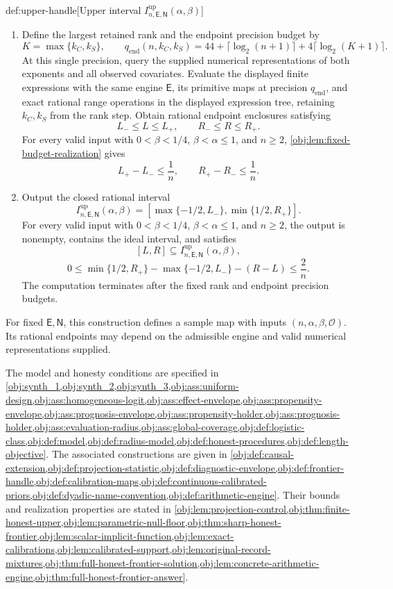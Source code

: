 \begin{algorithmv}{def:upper-handle}[Upper interval $I^{\mathrm{up}}_{n,\mathsf E,\mathsf N}(\alpha,\beta)$]
\begin{enumerate}
\item Define the largest retained rank and the endpoint precision budget by
\[
K=\max\{k_C,k_S\},
\qquad
q_{\mathrm{end}}(n,k_C,k_S)
=44+\lceil\log_2(n+1)\rceil
+4\lceil\log_2(K+1)\rceil.
\]
At this single precision, query the supplied numerical representations of both exponents and all observed covariates. Evaluate the displayed finite expressions with the same engine \(\mathsf E\), its primitive maps at precision \(q_{\mathrm{end}}\), and exact rational range operations in the displayed expression tree, retaining \(k_C,k_S\) from the rank step. Obtain rational endpoint enclosures satisfying
\[
L_-\le L\le L_+,
\qquad
R_-\le R\le R_+.
\]
For every valid input with \(0<\beta<1/4\), \(\beta<\alpha\le1\), and \(n\ge2\), \cref{obj:lem:fixed-budget-realization} gives
\[
L_+-L_-\le\frac1n,
\qquad
R_+-R_-\le\frac1n.
\]

\item Output the closed rational interval
\[
I^{\mathrm{up}}_{n,\mathsf E,\mathsf N}(\alpha,\beta)
=
\left[
\max\{-1/2,L_-\},
\min\{1/2,R_+\}
\right].
\]
For every valid input with \(0<\beta<1/4\), \(\beta<\alpha\le1\), and \(n\ge2\), the output is nonempty, contains the ideal interval, and satisfies
\[
[L,R]\subseteq
I^{\mathrm{up}}_{n,\mathsf E,\mathsf N}(\alpha,\beta),
\]
\[
0\le
\min\{1/2,R_+\}-\max\{-1/2,L_-\}-(R-L)
\le\frac2n.
\]
The computation terminates after the fixed rank and endpoint precision budgets.
\end{enumerate}
For fixed \(\mathsf E,\mathsf N\), this construction defines a sample map with inputs \((n,\alpha,\beta,\mathcal O)\). Its rational endpoints may depend on the admissible engine and valid numerical representations supplied.

The model and honesty conditions are specified in \cref{obj:synth_1,obj:synth_2,obj:synth_3,obj:ass:uniform-design,obj:ass:homogeneous-logit,obj:ass:effect-envelope,obj:ass:propensity-envelope,obj:ass:prognosis-envelope,obj:ass:propensity-holder,obj:ass:prognosis-holder,obj:ass:evaluation-radius,obj:ass:global-coverage,obj:def:logistic-class,obj:def:model,obj:def:radius-model,obj:def:honest-procedures,obj:def:length-objective}. The associated constructions are given in \cref{obj:def:causal-extension,obj:def:projection-statistic,obj:def:diagnostic-envelope,obj:def:frontier-handle,obj:def:calibration-maps,obj:def:continuous-calibrated-priors,obj:def:dyadic-name-convention,obj:def:arithmetic-engine}. Their bounds and realization properties are stated in \cref{obj:lem:projection-control,obj:thm:finite-honest-upper,obj:lem:parametric-null-floor,obj:thm:sharp-honest-frontier,obj:lem:scalar-implicit-function,obj:lem:exact-calibrations,obj:lem:calibrated-support,obj:lem:original-record-mixtures,obj:thm:full-honest-frontier-solution,obj:lem:concrete-arithmetic-engine,obj:thm:full-honest-frontier-answer}.
\end{algorithmv}

